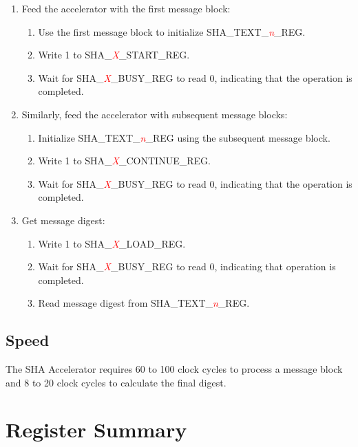 \documentclass[main\_\_EN.tex]{subfiles}
\begin{document}
\begin{enumerate}
    \item Feed the accelerator with the first message block:
    \begin{enumerate}
        \item Use the first message block to initialize SHA\_TEXT\_\textcolor{red}{\it{n}}\_REG.
		\item Write 1 to SHA\_\textcolor{red}{\it{X}}\_START\_REG.
		\item Wait for SHA\_\textcolor{red}{\it{X}}\_BUSY\_REG to read 0, indicating that the operation is completed.
    \end{enumerate}

    \item Similarly, feed the accelerator with subsequent message blocks:
    \begin{enumerate}
        \item Initialize SHA\_TEXT\_\textcolor{red}{\it{n}}\_REG using the subsequent message block.
		\item Write 1 to SHA\_\textcolor{red}{\it{X}}\_CONTINUE\_REG.
		\item Wait for SHA\_\textcolor{red}{\it{X}}\_BUSY\_REG to read 0, indicating that the operation is completed.
    \end{enumerate}

    \item Get message digest:
    \begin{enumerate}
        \item Write 1 to SHA\_\textcolor{red}{\it{X}}\_LOAD\_REG.
		\item Wait for SHA\_\textcolor{red}{\it{X}}\_BUSY\_REG to read 0, indicating that operation is completed.
		\item Read message digest from SHA\_TEXT\_\textcolor{red}{\it{n}}\_REG.
	\end{enumerate}
\end{enumerate}

\subsection{Speed}

The SHA Accelerator requires 60 to 100 clock cycles to process a message block and 8 to 20 clock cycles to calculate the final digest.

\hypertarget{sha-reg-summ}{}
\section{Register Summary}
\end{document}
